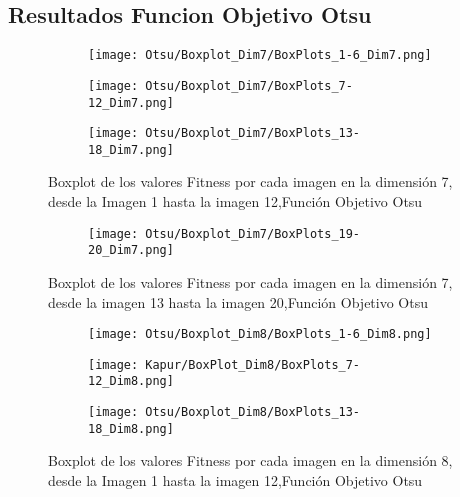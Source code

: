 \documentclass[conference]{IEEEtran}
\begin{document}
\subsection{Resultados Funcion Objetivo Otsu}
\begin{figure}
    \centering

    \begin{subfigure}{0.5\textwidth}
        \texttt{[image: Otsu/Boxplot\_Dim7/BoxPlots\_1-6\_Dim7.png]}
    \end{subfigure}
    
    \begin{subfigure}{0.5\textwidth}
        \texttt{[image: Otsu/Boxplot\_Dim7/BoxPlots\_7-12\_Dim7.png]}
    \end{subfigure}
         \begin{subfigure}{0.5\textwidth}
        \texttt{[image: Otsu/Boxplot\_Dim7/BoxPlots\_13-18\_Dim7.png]}
    \end{subfigure}
    \caption{Boxplot de los valores Fitness por cada imagen en la dimensión 7, desde la Imagen 1 hasta la imagen 12,Función Objetivo Otsu}
\label{fig:imagenes}    
\end{figure}

\begin{figure}
    \centering
    \begin{subfigure}{0.5\textwidth}
        \texttt{[image: Otsu/Boxplot\_Dim7/BoxPlots\_19-20\_Dim7.png]}
        \vspace{-150pt} %
    \end{subfigure}
    \caption{Boxplot de los valores Fitness por cada imagen en la dimensión 7, desde la imagen 13 hasta la imagen 20,Función Objetivo Otsu}
    \label{fig:imagenes}    
\end{figure}

\begin{figure}
    \centering

    \begin{subfigure}{0.5\textwidth}
        \texttt{[image: Otsu/Boxplot\_Dim8/BoxPlots\_1-6\_Dim8.png]}
    \end{subfigure}
    
    \begin{subfigure}{0.5\textwidth}
        \texttt{[image: Kapur/BoxPlot\_Dim8/BoxPlots\_7-12\_Dim8.png]}
    \end{subfigure}
         \begin{subfigure}{0.5\textwidth}
        \texttt{[image: Otsu/Boxplot\_Dim8/BoxPlots\_13-18\_Dim8.png]}
    \end{subfigure}
    \caption{Boxplot de los valores Fitness por cada imagen en la dimensión 8, desde la Imagen 1 hasta la imagen 12,Función Objetivo Otsu}
\label{fig:imagenes}    
\end{figure}
\end{document}
